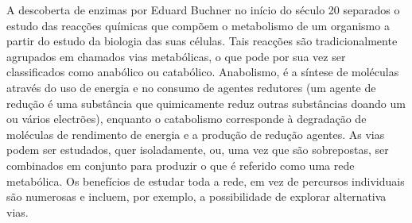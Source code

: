 \indent A descoberta de enzimas por Eduard Buchner no início do século 20 separados o estudo das reacções químicas que compõem o metabolismo de um organismo a partir do estudo da biologia das suas células. Tais reacções são tradicionalmente agrupados em chamados vias metabólicas, o que pode por sua vez ser classificados como anabólico ou catabólico. Anabolismo, é a síntese de moléculas através do uso de energia e no consumo de agentes redutores (um agente de redução é uma substância que quimicamente reduz outras substâncias doando um ou vários electrões), enquanto o catabolismo corresponde à degradação de moléculas de rendimento de energia e a produção de redução agentes. As vias podem ser estudados, quer isoladamente, ou, uma vez que são sobrepostas, ser combinados em conjunto para produzir o que é referido como uma rede metabólica. Os benefícios de estudar toda a rede, em vez de percursos individuais são numerosas e incluem, por exemplo, a possibilidade de explorar alternativa vias.



\cite{lacroixCTS08}